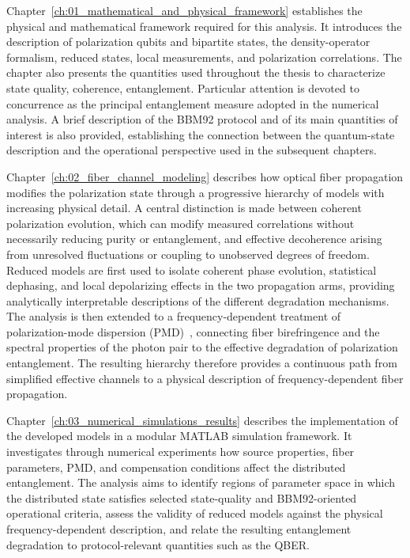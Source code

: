 Chapter~\ref{ch:01_mathematical_and_physical_framework} establishes the physical
and mathematical framework required for this analysis. It introduces the
description of polarization qubits and bipartite states, the density-operator
formalism, reduced states, local measurements, and polarization correlations. The
chapter also presents the quantities used throughout the thesis to characterize
state quality, coherence, entanglement. Particular attention is
devoted to concurrence as the principal entanglement measure adopted in the
numerical analysis. A brief description of the BBM92 protocol and of its main
quantities of interest is also provided, establishing the connection between the
quantum-state description and the operational perspective used in the subsequent
chapters.

Chapter~\ref{ch:02_fiber_channel_modeling} describes how optical fiber propagation
modifies the polarization state through a progressive hierarchy of models with
increasing physical detail. A central distinction is made between coherent
polarization evolution, which can modify measured correlations without necessarily
reducing purity or entanglement, and effective decoherence arising from unresolved
fluctuations or coupling to unobserved degrees of freedom. Reduced models are first
used to isolate coherent phase evolution, statistical dephasing, and local
depolarizing effects in the two propagation arms, providing analytically
interpretable descriptions of the different degradation mechanisms. The analysis
is then extended to a frequency-dependent treatment of polarization-mode
dispersion (PMD)~\cite{riccardi_polarization_entanglement_distribution_2021,
wai_menyuk_random_birefringence_1996,
antonelli_shtaif_brodsky_pmd_2011}, connecting fiber birefringence and the spectral
properties of the photon pair to the effective degradation of polarization
entanglement. The resulting hierarchy therefore provides a continuous path from
simplified effective channels to a physical description of frequency-dependent
fiber propagation.

Chapter~\ref{ch:03_numerical_simulations_results} describes the implementation of the developed 
models in a modular MATLAB simulation framework. It investigates through numerical
experiments how source properties, fiber parameters, PMD, and compensation
conditions affect the distributed entanglement. The analysis aims to identify
regions of parameter space in which the distributed state satisfies selected
state-quality and BBM92-oriented operational criteria, assess the validity of
reduced models against the physical frequency-dependent description, and relate
the resulting entanglement degradation to protocol-relevant quantities such as
the QBER.

